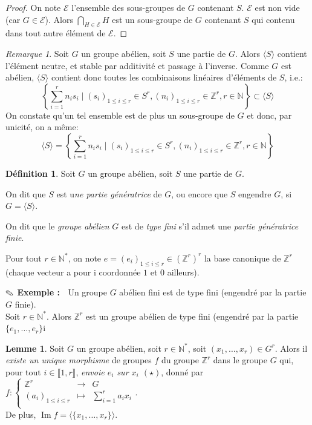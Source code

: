 \documentclass{article}
\newcommand{\Z}{\mathbb{Z}}
\newcommand{\N}{\mathbb{N}}
\newcommand{\im}{\mathop{\mathrm{Im}}\nolimits}
\newcommand{\dis}{\displaystyle}
\newcommand{\nt}[1]{\llbracket  #1 \rrbracket }
\theoremstyle{definition}
\newtheorem{defi}{Définition}
\newtheorem{lem}{Lemme}
\theoremstyle{remark}
\newtheorem{rem}{Remarque}
\newcommand{\exem}{{\textbf{$\text{\ding{46}}$ Exemple : \ }}}
\newcommand{\app}[5]{#1:\left\{\begin{array}{rcl}
#2 & \longrightarrow & #3 \\
#4 & \longmapsto & #5  \\
\end{array}\right.
}
\begin{document}
\begin{proof}
On note $\mathcal{E}$ l'ensemble des sous-groupes de $G$ contenant $S$. $\mathcal{E}$ est non vide (car $G \in\mathcal{E}$). Alors $\dis \bigcap_{H \in \mathcal{E}} H$ est un sous-groupe de $G$ contenant $S$ qui contenu dans tout autre élément de $\mathcal{E}$.
\end{proof}

\begin{rem}
Soit $G$ un groupe abélien, soit $S$ une partie de $G$. Alors $\langle S\rangle$ contient l'élément neutre, et stable par additivité et passage à l'inverse. Comme $G$ est abélien, $\langle S\rangle$ contient donc toutes les combinaisons linéaires d'éléments de $S$, i.e.:
$$\left\{\dis \sum_{i=1}^r n_is_i \mid (s_i)_{1 \leqslant i \leqslant r} \in S^r, (n_i)_{1 \leqslant i \leqslant r} \in \Z^r, r \in \N \right\}\subset\langle S\rangle$$
On constate qu'un tel ensemble est de plus un sous-groupe de $G$ et donc, par unicité, on a m\^eme:
$$\langle S\rangle=\left\{\dis \sum_{i=1}^r n_is_i \mid (s_i)_{1 \leqslant i \leqslant r} \in S^r, (n_i)_{1 \leqslant i \leqslant r} \in \Z^r, r \in \N \right\}$$
\end{rem}

\begin{defi}
Soit $G$ un groupe abélien, soit $S$ une partie de $G$. 
\begin{point}
\item On dit que $S$ est u\textit{ne partie génératrice} de $G$, ou encore que $S$ engendre $G$, si $G=\langle S\rangle$.
\item On dit que le \textit{groupe abélien} $G$ est de \textit{type fini} s'il admet une \textit{partie génératrice finie}. 
\end{point}
\end{defi}

Pour tout $r \in \N^*$, on note $e=(e_i)_{1 \leqslant i \leqslant r} \in \left(\Z^r\right)^r$ la base canonique de $\Z^r$ (chaque vecteur a pour i coordonnée $1$ et $0$ ailleurs).

\exem Un groupe $G$ abélien fini est de type fini (engendré par la partie $G$ finie). \\
Soit $r \in \N^*$. Alors $\Z^r$ est un groupe abélien de type fini (engendré par la partie $\{e_1, \ldots, e_r \}$i
\begin{lem}\label{morphisme-Zr-G}
Soit $G$ un groupe abélien, soit $r \in \N^*$, soit $(x_1, \ldots, x_r) \in G^r$. Alors il \textit{existe un unique morphisme} de groupes $f$ du groupe $\Z^r$ dans le groupe $G$ qui, pour tout $i \in \nt{1,r}$, \textit{envoie $e_i$ sur $x_i$ $(\star)$}, donné par $\app{f}{\Z^r}{G}{(a_i)_{1 \leqslant i \leqslant r}}{\dis \sum_{i=1}^ra_ix_i}$. \\ De plus, $\im f =\langle\{x_1, \ldots, x_r\}\rangle$.
\end{lem}
\end{document}
